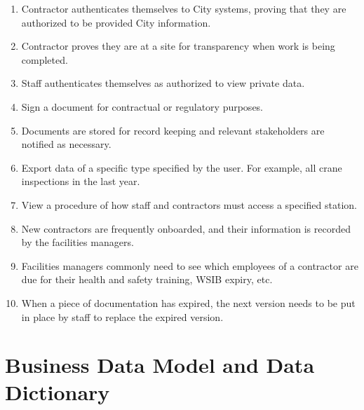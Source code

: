 \documentclass[12pt]{article}
\begin{document}
\begin{enumerate}
  \item Contractor authenticates themselves to City systems, proving that they
    are authorized to be provided City information.\\
  \item Contractor proves they are at a site for transparency when work is being
    completed.\\
  \item Staff authenticates themselves as authorized to view private data.\\
  \item Sign a document for contractual or regulatory purposes.\\
  \item Documents are stored for record keeping and relevant stakeholders
    are notified as necessary.\\
  \item Export data of a specific type specified by the user. For example, all
    crane inspections in the last year.\\
  \item View a procedure of how staff and contractors must access a specified
    station.\\
  \item New contractors are frequently onboarded, and their information is
    recorded by the facilities managers.\\
  \item Facilities managers commonly need to see which employees of a contractor
    are due for their health and safety training, WSIB expiry, etc.\\
  \item When a piece of documentation has expired, the next version needs to be
    put in place by staff to replace the expired version.\\
\end{enumerate}

\newpage{}
\section{Business Data Model and Data Dictionary}
\end{document}
